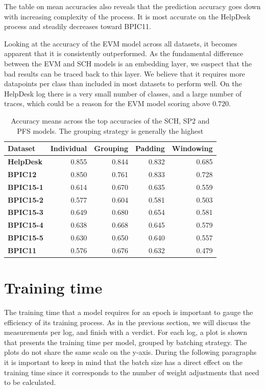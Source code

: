 The table on mean accuracies also reveals that the prediction accuracy goes down with increasing complexity of the process.
It is most accurate on the HelpDesk process and steadily decreases toward BPIC11.

Looking at the accuracy of the EVM model across all datasets, it becomes apparent that it is consistently outperformed.
As the fundamental difference between the EVM and SCH models is an embedding layer, we suspect that the bad results can be traced back to this layer.
We believe that it requires more datapoints per class than included in most datasets to perform well.
On the HelpDesk log there is a very small number of classes, and a large number of traces, which could be a reason for the EVM model scoring above $0.720$.

\begin{table}
\centering
\begin{tabular}{lrrrr}
\textbf{Dataset}  &  \textbf{Individual} &  \textbf{Grouping} &   \textbf{Padding} &  \textbf{Windowing}\\
\midrule
\textbf{HelpDesk} &    0.855    &  0.844    &  0.832    &  0.685    \\
\textbf{BPIC12  } &    0.850    &  0.761    &  0.833    &  0.728    \\
\textbf{BPIC15-1} &    0.614    &  0.670    &  0.635    &  0.559    \\
\textbf{BPIC15-2} &    0.577    &  0.604    &  0.581    &  0.503    \\
\textbf{BPIC15-3} &    0.649    &  0.680    &  0.654    &  0.581    \\
\textbf{BPIC15-4} &    0.638    &  0.668    &  0.645    &  0.579    \\
\textbf{BPIC15-5} &    0.630    &  0.650    &  0.640    &  0.557    \\
\textbf{BPIC11  } &    0.576    &  0.676    &  0.632    &  0.479    \\
\end{tabular}
\caption[Grouping strategy leads to best mean accuracies]{Accuracy means across the top accuracies of the SCH, SP2 and PFS models. The grouping strategy is generally the highest}
\label{tab:strategy-top-accuracies}
\end{table}
\FloatBarrier

\section{Training time}\label{sec:eval:training-time}
The training time that a model requires for an epoch is important to gauge the efficiency of its training process.
As in the previous section, we will discuss the measurements per log, and finish with a verdict.
For each log, a plot is shown that presents the training time per model, grouped by batching strategy.
The plots do not share the same scale on the y-axis.
During the following paragraphs it is important to keep in mind that the batch size has a direct effect on the training time since it corresponds to the number of weight adjustments that need to be calculated.

